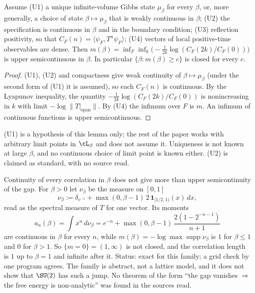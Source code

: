 \begin{lemma}\label{neg:lem-usc}
Assume \textup{(U1)} a unique infinite-volume Gibbs state $\mu_\beta$ for every $\beta$, or, more
generally, a choice of state $\beta\mapsto\mu_\beta$ that is weakly continuous in $\beta$;
\textup{(U2)} the specification is continuous in $\beta$ and in the boundary condition;
\textup{(U3)} reflection positivity, so that $C_F(n)=\langle\psi_F,T^n\psi_F\rangle$;
\textup{(U4)} vectors of local positive-time observables are dense. Then
$m(\beta)=\inf_F\inf_k\bigl(-\tfrac1{2k}\log(C_F(2k)/C_F(0))\bigr)$ is upper semicontinuous in
$\beta$. In particular $\{\beta:m(\beta)\ge c\}$ is closed for every $c$.
\end{lemma}

\begin{proof}
(U1), (U2) and compactness give weak continuity of $\beta\mapsto\mu_\beta$ (under the second
form of (U1) it is assumed), so each $C_F(n)$ is continuous. By the Lyapunov inequality, the quantity
$-\frac1{2k}\log(C_F(2k)/C_F(0))$ is nonincreasing in $k$
with limit $-\log\|T|_{\overline{\mathrm{span}}}\|$. By (U4) the infimum over $F$ is $m$. An
infimum of continuous functions is upper semicontinuous.
\end{proof}

(U1) is a hypothesis of this lemma only; the rest of the paper works with arbitrary limit points
in $\cL_\beta$ and does not assume it. Uniqueness is not known at large $\beta$, and no continuous
choice of limit point is known either. (U2) is claimed as standard, with no source read.

\begin{observation}\label{neg:obs-usc}
Continuity of every correlation in $\beta$ does not give more than upper semicontinuity of the
gap. For $\beta>0$ let $\nu_\beta$ be the measure on $[0,1]$
\[
\nu_\beta:=\delta_{e^{-1}}+\max(0,\beta-1)\,2\,\mathbf 1_{[1/2,1)}(x)\,dx,
\]
read as the spectral measure of $T$ for one vector. Its moments
\[
a_n(\beta)=\int x^n\,d\nu_\beta=e^{-n}+\max(0,\beta-1)\,\frac{2(1-2^{-n-1})}{n+1}
\]
are continuous in $\beta$ for every $n$, while $m(\beta)=-\log\max\operatorname{supp}\nu_\beta$ is $1$ for $\beta\le1$
and $0$ for $\beta>1$. So $\{m=0\}=(1,\infty)$ is not closed, and the correlation length is $1$ up
to $\beta=1$ and infinite after it. Status: exact for this family; a grid check by one program
agrees. The family is abstract, not a lattice model, and it does not show that $\SU(2)$ has such a
jump. No theorem of the form ``the gap vanishes $\Rightarrow$ the free energy is non-analytic''
was found in the sources read.
\end{observation}

